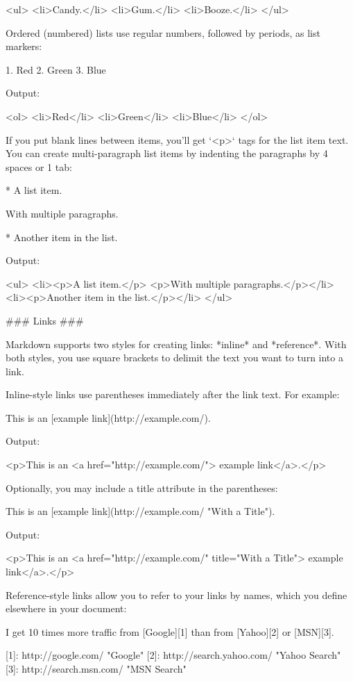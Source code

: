     <ul>
    <li>Candy.</li>
    <li>Gum.</li>
    <li>Booze.</li>
    </ul>

Ordered (numbered) lists use regular numbers, followed by periods, as
list markers:

    1.  Red
    2.  Green
    3.  Blue

Output:

    <ol>
    <li>Red</li>
    <li>Green</li>
    <li>Blue</li>
    </ol>

If you put blank lines between items, you'll get `<p>` tags for the
list item text. You can create multi-paragraph list items by indenting
the paragraphs by 4 spaces or 1 tab:

    *   A list item.
    
        With multiple paragraphs.

    *   Another item in the list.

Output:

    <ul>
    <li><p>A list item.</p>
    <p>With multiple paragraphs.</p></li>
    <li><p>Another item in the list.</p></li>
    </ul>
    


### Links ###

Markdown supports two styles for creating links: *inline* and
*reference*. With both styles, you use square brackets to delimit the
text you want to turn into a link.

Inline-style links use parentheses immediately after the link text.
For example:

    This is an [example link](http://example.com/).

Output:

    <p>This is an <a href="http://example.com/">
    example link</a>.</p>

Optionally, you may include a title attribute in the parentheses:

    This is an [example link](http://example.com/ "With a Title").

Output:

    <p>This is an <a href="http://example.com/" title="With a Title">
    example link</a>.</p>

Reference-style links allow you to refer to your links by names, which
you define elsewhere in your document:

    I get 10 times more traffic from [Google][1] than from
    [Yahoo][2] or [MSN][3].

    [1]: http://google.com/        "Google"
    [2]: http://search.yahoo.com/  "Yahoo Search"
    [3]: http://search.msn.com/    "MSN Search"

